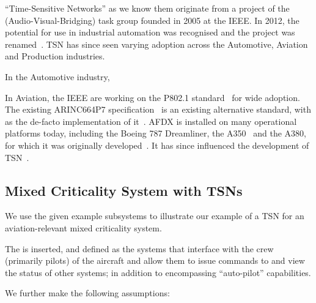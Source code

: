 ``Time-Sensitive Networks'' as we know them originate from a project of the  (Audio-Visual-Bridging) task group founded in 2005 at the IEEE.
In 2012, the potential for use in industrial automation was recognised and the project was renamed~\cite{imtiazProposalIntegrateProcess2011,zezulkaTimeSensitiveNetworkingCommunication2019}.
TSN has since seen varying adoption across the Automotive, Aviation and Production industries.

In the Automotive industry,

In Aviation, the IEEE are working on the P802.1 standard~\cite{P8021DPTSN2024} for wide adoption.
The existing ARINC664P7 specification~\cite{ARINC664P71AIRCRAFTDATA2009} is an existing alternative standard, with  as the de-facto implementation of it~\cite{moreauxDataTransmissionSystem2005}.
AFDX is installed on many operational platforms today, including the Boeing 787 Dreamliner\cite{AFDXTechnologyImprove2005}, the A350~\cite{AirbusRockwellCollins13} and the A380, for which it was originally developed~\cite{itierA380IntegratedModular}.
It has since influenced the development of TSN~\cite{pasquierAvionicsFullDuplex2015}.


\subsection{Mixed Criticality System with TSNs}

We use the given example subsystems to illustrate our example of a TSN for an aviation-relevant mixed criticality system.

The  is inserted, and defined as the systems that interface with the crew (primarily pilots) of the aircraft and allow them to issue commands to and view the status of other systems; in addition to encompassing ``auto-pilot'' capabilities.

We further make the following assumptions:


